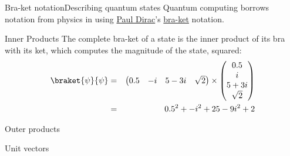 \begin{frame}{Bra-ket notation}{Describing quantum states}
Quantum computing borrows notation from physics in using \href{https://en.wikipedia.org/wiki/Paul_Dirac}{Paul Dirac}'s \href{https://en.wikipedia.org/wiki/Bra-ket_notation}{bra-ket} notation.

\end{frame}

\begin{frame}{Inner Products}
The complete bra-ket of a state is the inner product of its bra with its ket, which computes the magnitude of the state, squared:
\begin{eqnarray*}
\braket{\psi}{\psi} & = &
\begin{pmatrix}
0.5 & -i & 5-3i &  \sqrt{2}
\end{pmatrix}
\times\begin{pmatrix}
0.5\\ i \\ 5+3i \\ \sqrt{2}
\end{pmatrix}
\\
 & = & 0.5^{2} + -i^{2} + 25-9i^{2} + 2 
\end{eqnarray*}
    
\end{frame}

\begin{frame}{Outer products}

\end{frame}

\begin{frame}{Unit vectors}

\end{frame}


